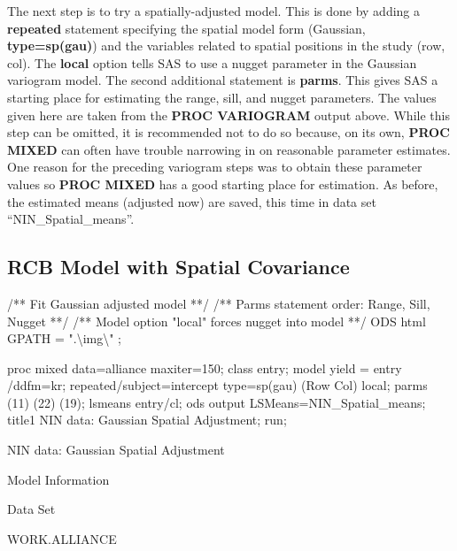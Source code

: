 \documentclass[
]{book}
\newenvironment{Shaded}{\begin{snugshade}}{\end{snugshade}}
\newcommand{\NormalTok}[1]{#1}
\begin{document}
The next step is to try a spatially-adjusted model. This is done by adding a \textbf{repeated} statement specifying the spatial model form (Gaussian, \textbf{type=sp(gau)}) and the variables related to spatial positions in the study (row, col). The \textbf{local} option tells SAS to use a nugget parameter in the Gaussian variogram model. The second additional statement is \textbf{parms}. This gives SAS a starting place for estimating the range, sill, and nugget parameters. The values given here are taken from the \textbf{PROC VARIOGRAM} output above. While this step can be omitted, it is recommended not to do so because, on its own, \textbf{PROC MIXED} can often have trouble narrowing in on reasonable parameter estimates. One reason for the preceding variogram steps was to obtain these parameter values so \textbf{PROC MIXED} has a good starting place for estimation. As before, the estimated means (adjusted now) are saved, this time in data set ``NIN\_Spatial\_means''.

\hypertarget{rcb-model-with-spatial-covariance}{%
\subsection{RCB Model with Spatial Covariance}\label{rcb-model-with-spatial-covariance}}

\begin{Shaded}
\begin{Highlighting}[]

\NormalTok{/** Fit Gaussian adjusted model **/}
\NormalTok{/** Parms statement order: Range, Sill, Nugget **/}
\NormalTok{/** Model option "local" forces nugget into model **/}
\NormalTok{ODS html GPATH = ".\textbackslash{}img\textbackslash{}" ;}

\NormalTok{proc mixed data=alliance maxiter=150;}
\NormalTok{    class entry;}
\NormalTok{    model yield = entry /ddfm=kr;}
\NormalTok{    repeated/subject=intercept type=sp(gau) (Row Col) local;}
\NormalTok{    parms (11) (22) (19);}
\NormalTok{    lsmeans entry/cl;}
\NormalTok{    ods output LSMeans=NIN\_Spatial\_means;}
\NormalTok{    title1 \textquotesingle{}NIN data: Gaussian Spatial Adjustment\textquotesingle{};}
\NormalTok{run;}
\end{Highlighting}
\end{Shaded}

NIN data: Gaussian Spatial Adjustment

Model Information

Data Set

WORK.ALLIANCE
\end{document}
